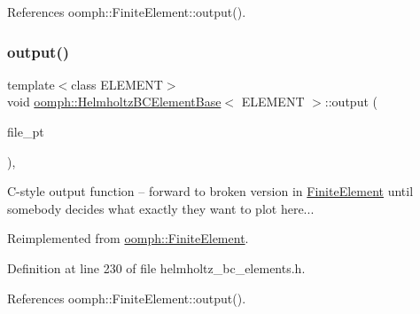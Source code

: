 References oomph\+::\+Finite\+Element\+::output().

\mbox{\label{classoomph_1_1HelmholtzBCElementBase_a6dbcc0b0a81ab422f6a45f4d4a63d9a3}} 
\subsubsection{\texorpdfstring{output()}{output()}\hspace{0.1cm}{\footnotesize\ttfamily [3/4]}}
{\footnotesize\ttfamily template$<$class E\+L\+E\+M\+E\+NT$>$ \\
void \hyperlink{classoomph_1_1HelmholtzBCElementBase}{oomph\+::\+Helmholtz\+B\+C\+Element\+Base}$<$ E\+L\+E\+M\+E\+NT $>$\+::output (\begin{DoxyParamCaption}\item[{F\+I\+LE $\ast$}]{file\+\_\+pt }\end{DoxyParamCaption})\hspace{0.3cm}{\ttfamily [inline]}, {\ttfamily [virtual]}}

C-\/style output function -- forward to broken version in \hyperlink{classoomph_1_1FiniteElement}{Finite\+Element} until somebody decides what exactly they want to plot here... 

Reimplemented from \hyperlink{classoomph_1_1FiniteElement_a72cddd09f8ddbee1a20a1ff404c6943e}{oomph\+::\+Finite\+Element}.



Definition at line 230 of file helmholtz\+\_\+bc\+\_\+elements.\+h.



References oomph\+::\+Finite\+Element\+::output().

\mbox{\label{classoomph_1_1HelmholtzBCElementBase_ac521eae27bbc9dbd72c788ecfe59f4cc}} 
